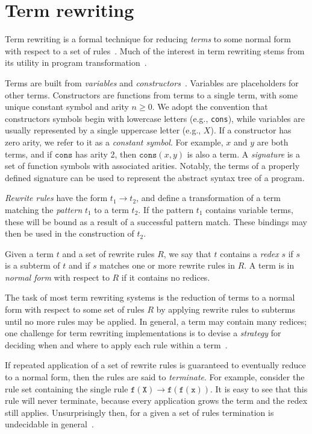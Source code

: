 
\section{Term rewriting}
\label{sec:background:trs}

Term rewriting is a formal technique for reducing \emph{terms} to
some normal form with respect to a set of
rules~\cite{baader98term}. Much of the interest in term rewriting
stems from its utility in program
transformation~\cite{visser01survey}.

Terms are built from \emph{variables} and
\emph{constructors}~\cite{baader98term}. Variables are
placeholders for other terms. Constructors are functions from
terms to a single term, with some unique constant symbol and arity
$n \geq 0$. We adopt the convention that constructors symbols
begin with lowercase letters (e.g., \texttt{cons}), while
variables are usually represented by a single uppercase letter
(e.g., $X$). If a constructor has zero arity, we refer to it as a
\emph{constant symbol}. For example, $x$ and $y$ are both terms,
and if $\mathtt{cons}$ has arity 2, then $\mathtt{cons}(x,y)$ is
also a term. A \emph{signature} is a set of function symbols with
associated arities. Notably, the terms of a properly defined
signature can be used to represent the abstract syntax tree of a
program.

\emph{Rewrite rules} have the form $t_1 \to t_2$, and define a
transformation of a term matching the \emph{pattern} $t_1$ to a
term $t_2$. If the pattern $t_1$ contains variable terms, these
will be bound as a result of a successful pattern match. These
bindings may then be used in the construction of $t_2$.

Given a term $t$ and a set of rewrite rules $R$, we say that $t$
contains a \emph{redex} $s$ if $s$ is a subterm of $t$ and if $s$
matches one or more rewrite rules in $R$. A term is in
\emph{normal form} with respect to $R$ if it contains no redices.

The task of most term rewriting systems is the reduction of terms
to a normal form with respect to some set of rules $R$ by applying
rewrite rules to subterms until no more rules may be applied. In
general, a term may contain many redices; one challenge for term
rewriting implementations is to devise a \emph{strategy} for
deciding when and where to apply each rule within a
term~\cite{visser01survey}.

If repeated application of a set of rewrite rules is guaranteed to
eventually reduce to a normal form, then the rules are said to
\emph{terminate}. For example, consider the rule set containing
the single rule $\mathtt{f(X) \to f(f(x))}$. It is easy to see
that this rule will never terminate, because every application
grows the term and the redex still applies. Unsurprisingly then,
for a given a set of rules termination is undecidable in
general~\cite{baader98term}.

